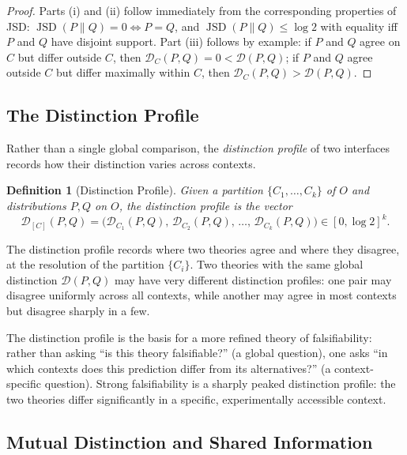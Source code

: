 \documentclass[12pt,a4paper]{article}
\newtheorem{definition}[theorem]{Definition}
\theoremstyle{remark}
\theoremstyle{definition}
\begin{document}
\begin{proof}
Parts (i) and (ii) follow immediately from the corresponding properties
of JSD: $\operatorname{JSD}(P\|Q) = 0 \iff P = Q$, and
$\operatorname{JSD}(P\|Q) \leq \log 2$ with equality iff $P$ and $Q$
have disjoint support. Part (iii) follows by example: if $P$ and $Q$
agree on $C$ but differ outside $C$, then $\mathcal{D}_C(P,Q) = 0 <
\mathcal{D}(P,Q)$; if $P$ and $Q$ agree outside $C$ but differ maximally
within $C$, then $\mathcal{D}_C(P,Q) > \mathcal{D}(P,Q)$.
\end{proof}

\subsection{The Distinction Profile}

Rather than a single global comparison, the \emph{distinction profile}
of two interfaces records how their distinction varies across contexts.

\begin{definition}[Distinction Profile]
Given a partition $\{C_1, \ldots, C_k\}$ of $O$ and distributions $P, Q$
on $O$, the \emph{distinction profile} is the vector
\begin{equation}
  \mathcal{D}_{[C]}(P,Q)
  = \bigl(\mathcal{D}_{C_1}(P,Q),\, \mathcal{D}_{C_2}(P,Q),\,
    \ldots,\, \mathcal{D}_{C_k}(P,Q)\bigr) \in [0, \log 2]^k.
\end{equation}
\end{definition}

The distinction profile records where two theories agree and where they
disagree, at the resolution of the partition $\{C_i\}$. Two theories
with the same global distinction $\mathcal{D}(P,Q)$ may have very
different distinction profiles: one pair may disagree uniformly across
all contexts, while another may agree in most contexts but disagree
sharply in a few.

The distinction profile is the basis for a more refined theory of
falsifiability: rather than asking ``is this theory falsifiable?'' (a
global question), one asks ``in which contexts does this prediction
differ from its alternatives?'' (a context-specific question). Strong
falsifiability is a sharply peaked distinction profile: the two theories
differ significantly in a specific, experimentally accessible context.

\subsection{Mutual Distinction and Shared Information}
\end{document}
